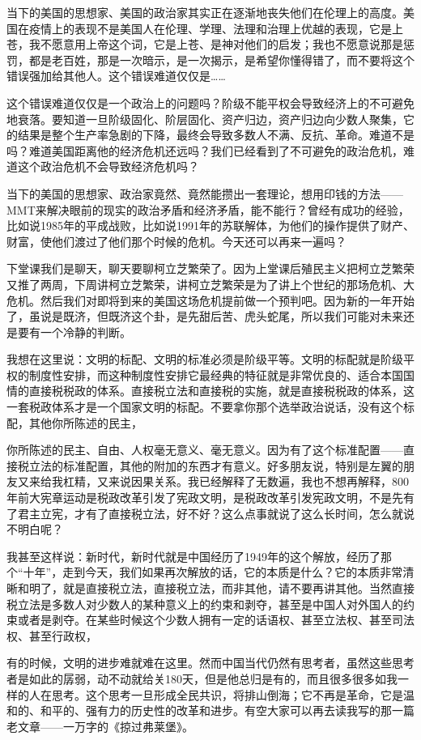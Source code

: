 \documentclass[UTF8, 12pt, a4paper]{ctexrep}
\begin{document}
当下的美国的思想家、美国的政治家其实正在逐渐地丧失他们在伦理上的高度。美国在疫情上的表现不是美国人在伦理、学理、法理和治理上优越的表现，它是上苍，我不愿意用上帝这个词，它是上苍、是神对他们的启发；我也不愿意说那是惩罚，都是老百姓，那是一次暗示，是一次揭示，是希望你懂得错了，而不要将这个错误强加给其他人。这个错误难道仅仅是……

这个错误难道仅仅是一个政治上的问题吗？阶级不能平权会导致经济上的不可避免地衰落。要知道一旦阶级固化、阶层固化、资产归边，资产归边向少数人聚集，它的结果是整个生产率急剧的下降，最终会导致多数人不满、反抗、革命。难道不是吗？难道美国距离他的经济危机还远吗？我们已经看到了不可避免的政治危机，难道这个政治危机不会导致经济危机吗？

当下的美国的思想家、政治家竟然、竟然能攒出一套理论，想用印钱的方法——MMT来解决眼前的现实的政治矛盾和经济矛盾，能不能行？曾经有成功的经验，比如说1985年的平成战败，比如说1991年的苏联解体，为他们的操作提供了财产、财富，使他们渡过了他们那个时候的危机。今天还可以再来一遍吗？

下堂课我们是聊天，聊天要聊柯立芝繁荣了。因为上堂课后殖民主义把柯立芝繁荣又推了两周，下周讲柯立芝繁荣，讲柯立芝繁荣是为了讲上个世纪的那场危机、大危机。然后我们对即将到来的美国这场危机提前做一个预判吧。因为新的一年开始了，虽说是既济，但既济这个卦，是先甜后苦、虎头蛇尾，所以我们可能对未来还是要有一个冷静的判断。

我想在这里说：文明的标配、文明的标准必须是阶级平等。文明的标配就是阶级平权的制度性安排，而这种制度性安排它最经典的特征就是非常优良的、适合本国国情的直接税税政的体系。直接税立法和直接税的实施，就是直接税税政的体系，这一套税政体系才是一个国家文明的标配。不要拿你那个选举政治说话，没有这个标配，其他你所陈述的民主，

你所陈述的民主、自由、人权毫无意义、毫无意义。因为有了这个标准配置——直接税立法的标准配置，其他的附加的东西才有意义。好多朋友说，特别是左翼的朋友又来给我杠精，又来说因果关系。我已经解释了无数遍，我也不想再解释，800年前大宪章运动是税政改革引发了宪政文明，是税政改革引发宪政文明，不是先有了君主立宪，才有了直接税立法，好不好？这么点事就说了这么长时间，怎么就说不明白呢？

我甚至这样说：新时代，新时代就是中国经历了1949年的这个解放，经历了那个“十年”，走到今天，我们如果再次解放的话，它的本质是什么？它的本质非常清晰和明了，就是直接税立法，直接税立法，而非其他，请不要再讲其他。当然直接税立法是多数人对少数人的某种意义上的约束和剥夺，甚至是中国人对外国人的约束或者是剥夺。在某些时候这个少数人拥有一定的话语权、甚至立法权、甚至司法权、甚至行政权，

有的时候，文明的进步难就难在这里。然而中国当代仍然有思考者，虽然这些思考者是如此的孱弱，动不动就给关180天，但是他总归是有的，而且很多很多如我一样的人在思考。这个思考一旦形成全民共识，将排山倒海；它不再是革命，它是温和的、和平的、强有力的历史性的改革和进步。有空大家可以再去读我写的那一篇老文章——一万字的《掠过弗莱堡》。
\end{document}
